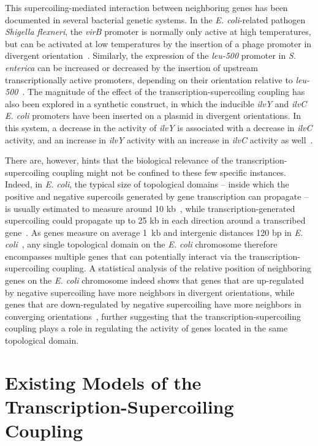 This supercoiling-mediated interaction between neighboring genes has been documented in several bacterial genetic systems.
In the \emph{E. coli}-related pathogen \emph{Shigella flexneri}, the \emph{virB} promoter is normally only active at high temperatures, but can be activated at low temperatures by the insertion of a phage promoter in divergent orientation~\citep{tobe1995}.
Similarly, the expression of the \emph{leu-500} promoter in \emph{S. enterica} can be increased or decreased by the insertion of upstream transcriptionally active promoters, depending on their orientation relative to \emph{leu-500}~\citep{elhanafi2000}.
The magnitude of the effect of the transcription-supercoiling coupling has also been explored in a synthetic construct, in which the inducible \emph{ilvY} and \emph{ilvC} \emph{E. coli} promoters have been inserted on a plasmid in divergent orientations.
In this system, a decrease in the activity of \emph{ilvY} is associated with a decrease in \emph{ilvC} activity, and an increase in \emph{ilvY} activity with an increase in \emph{ilvC} activity as well~\citep{rhee1999}.

There are, however, hints that the biological relevance of the transcription-supercoiling coupling might not be confined to these few specific instances.
Indeed, in \emph{E. coli}, the typical size of topological domains -- inside which the positive and negative supercoils generated by gene transcription can propagate -- is usually estimated to measure around 10 kb~\citep{postow2004}, while transcription-generated supercoiling could propagate up to 25 kb in each direction around a transcribed gene~\citep{visser2022}.
As genes measure on average 1~kb and intergenic distances 120 bp in \emph{E. coli}~\citep{blattner1997}, any single topological domain on the \emph{E. coli} chromosome therefore encompasses multiple genes that can potentially interact via the transcription-supercoiling coupling.
A statistical analysis of the relative position of neighboring genes on the \emph{E. coli} chromosome indeed shows that genes that are up-regulated by negative supercoiling have more neighbors in divergent orientations, while genes that are down-regulated by negative supercoiling have more neighbors in converging orientations~\citep{sobetzko2016}, further suggesting that the transcription-supercoiling coupling plays a role in regulating the activity of genes located in the same topological domain.


\section{Existing Models of the Transcription-Supercoiling Coupling}

